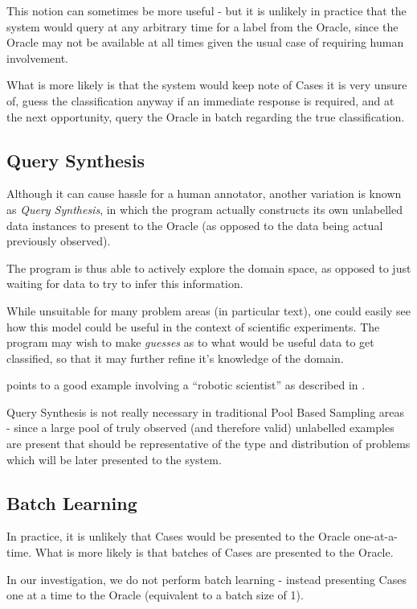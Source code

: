 \documentclass[a4paper,11pt]{report}
\begin{document}
This notion can sometimes be more useful - but it is unlikely in practice that the system would query at any arbitrary time for a label from the Oracle, since the Oracle may not be available at all times given the usual case of requiring human involvement.

What is more likely is that the system would keep note of Cases it is very unsure of, guess the classification anyway if an immediate response is required, and at the next opportunity, query the Oracle in batch regarding the true classification.

\subsection{Query Synthesis}
Although it can cause hassle for a human annotator, another variation is known as \emph{Query Synthesis}, in which the program actually constructs its own unlabelled data instances to present to the Oracle (as opposed to the data being actual previously observed).

The program is thus able to actively explore the domain space, as opposed to just waiting for data to try to infer this information.

While unsuitable for many problem areas (in particular text), one could easily see how this model could be useful in the context of scientific experiments. The program may wish to make \emph{guesses} as to what would be useful data to get classified, so that it may further refine it's knowledge of the domain.

\citet{Settles2010} points to a good example involving a ``robotic scientist'' as described in \citet{King2009}.

Query Synthesis is not really necessary in traditional Pool Based Sampling areas - since a large pool of truly observed (and therefore valid) unlabelled examples are present that should be representative of the type and distribution of problems which will be later presented to the system.

\subsection{Batch Learning}
In practice, it is unlikely that Cases would be presented to the Oracle one-at-a-time. What is more likely is that batches of Cases are presented to the Oracle.

In our investigation, we do not perform batch learning - instead presenting Cases one at a time to the Oracle (equivalent to a batch size of 1).
\end{document}
